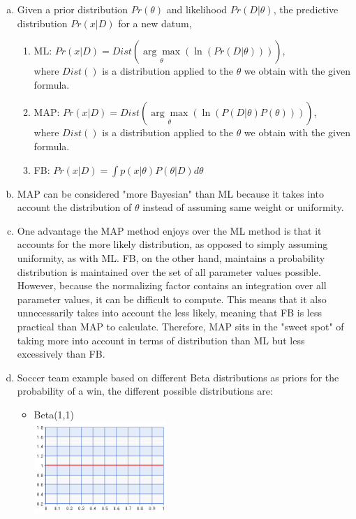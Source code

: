 \documentclass[11pt]{article}
\begin{document}
\begin{enumerate}[a.]
\item Given a prior distribution $Pr(\theta)$ and likelihood $Pr(D|\theta)$, the predictive distribution $Pr(x|D)$ for a new datum,
\begin{enumerate}
\item ML: $Pr(x|D)=Dist(\underset{\theta}{\arg\max}(\ln(Pr(D|\theta))))$, \\where $Dist()$ is a distribution applied to the $\theta$ we obtain with the given formula.
\item MAP: $Pr(x|D)=Dist(\underset{\theta}{\arg\max}(\ln(P(D|\theta)P(\theta))))$, \\where $Dist()$ is a distribution applied to the $\theta$ we obtain with the given formula.
\item FB: $Pr(x|D)=\int p(x|\theta) P(\theta|D)d\theta$
\end{enumerate}
\item MAP can be considered "more Bayesian" than ML because it takes into account the distribution of $\theta$ instead of assuming same weight or uniformity.
\item One advantage the MAP method enjoys over the ML method is that it accounts for the more likely distribution, as opposed to simply assuming uniformity, as with ML. FB, on the other hand, maintains a probability distribution is maintained over the set of all parameter values possible. However, because the normalizing factor contains an integration over all parameter values, it can be difficult to compute. This means that it also unnecessarily takes into account the less likely, meaning that FB is less practical than MAP to calculate. Therefore, MAP sits in the "sweet spot" of taking more into account in terms of distribution than ML but less excessively than FB.
\item Soccer team example based on different Beta distributions as priors for the probability of a win, the different possible distributions are:
\begin{itemize}
\item Beta(1,1)\\
\includegraphics[width=50mm]{beta11.png}\\

\end{itemize}
\end{enumerate}
\end{document}
